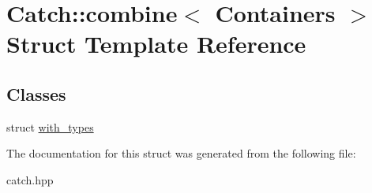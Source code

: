 \hypertarget{structCatch_1_1combine}{}\section{Catch\+::combine$<$ Containers $>$ Struct Template Reference}
\label{structCatch_1_1combine}
\subsection*{Classes}
\begin{DoxyCompactItemize}
\item 
struct \mbox{\hyperlink{structCatch_1_1combine_1_1with__types}{with\+\_\+types}}
\end{DoxyCompactItemize}


The documentation for this struct was generated from the following file\+:\begin{DoxyCompactItemize}
\item 
catch.\+hpp\end{DoxyCompactItemize}
